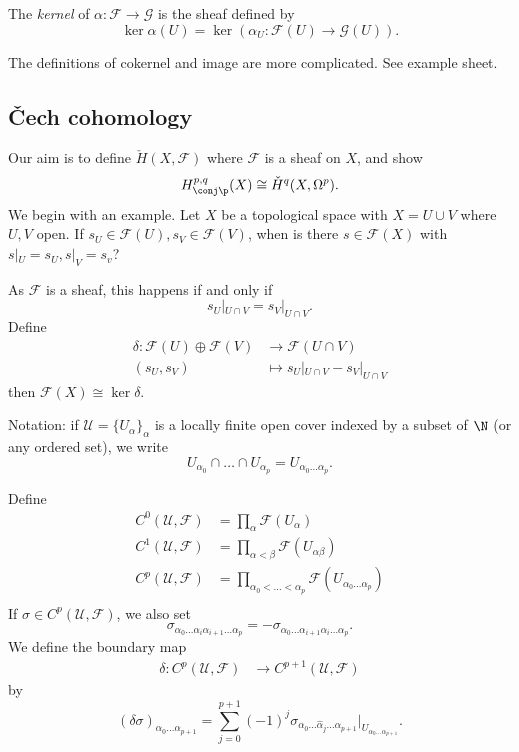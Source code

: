 \documentclass[a4paper]{article}
\begin{document}
\begin{definition}
  The \emph{kernel} of \(\alpha: \mathcal F \to \mathcal G\) is the sheaf defined by
  \[
    \ker \alpha(U) = \ker (\alpha_U: \mathcal F(U) \to \mathcal G(U)).
  \]
\end{definition}

The definitions of cokernel and image are more complicated. See example sheet.

\subsection{Čech cohomology}

Our aim is to define \(\check H(X, \mathcal F)\) where \(\mathcal F\) is a sheaf on \(X\), and show
\[
  H_{\conj \p}^{p, q}(X) \cong \check H^q(X, \Omega^p).
\]
We begin with an example. Let \(X\) be a topological space with \(X = U \cup V\) where \(U, V\) open. If \(s_U \in \mathcal F(U), s_V \in \mathcal F(V)\), when is there \(s \in \mathcal F(X)\) with \(s|_U = s_U, s|_V = s_v\)?

As \(\mathcal F\) is a sheaf, this happens if and only if
\[
  s_U|_{U \cap V} = s_V|_{U \cap V}.
\]
Define
\begin{align*}
  \delta: \mathcal F(U) \oplus \mathcal F(V) &\to \mathcal F(U \cap V) \\
  (s_U, s_V) &\mapsto s_U|_{U \cap V} - s_V|_{U \cap V}
\end{align*}
then \(\mathcal F(X) \cong \ker \delta\).

\begin{notation}
  Notation: if \(\mathcal U = \{U_\alpha\}_\alpha\) is a locally finite open cover indexed by a subset of \(\N\) (or any ordered set), we write
  \[
    U_{\alpha_0} \cap \dots \cap U_{\alpha_p} = U_{\alpha_0 \dots \alpha_p}.
  \]
\end{notation}

Define
\begin{align*}
  C^0(\mathcal U, \mathcal F) &= \prod_\alpha \mathcal F(U_\alpha) \\
  C^1(\mathcal U, \mathcal F) &= \prod_{\alpha < \beta} \mathcal F(U_{\alpha\beta}) \\
  C^p(\mathcal U, \mathcal F) &= \prod_{\alpha_0 < \dots < \alpha_p} \mathcal F(U_{\alpha_0 \dots \alpha_p}) \\
\end{align*}
If \(\sigma \in C^p(\mathcal U, \mathcal F)\), we also set
\[
  \sigma_{\alpha_0 \dots \alpha_i \alpha_{i + 1} \dots \alpha_p} = - \sigma_{\alpha_0 \dots \alpha_{i + 1} \alpha_i \dots \alpha_p}.
\]
We define the boundary map
\begin{align*}
  \delta: C^p(\mathcal U, \mathcal F) &\to C^{p + 1}(\mathcal U, \mathcal F)
\end{align*}
by
\[
  (\delta\sigma)_{\alpha_0 \dots \alpha_{p + 1}} = \sum_{j = 0}^{p + 1} (-1)^j \sigma_{\alpha_0 \dots \hat \alpha_j \dots \alpha_{p + 1}} |_{U_{\alpha_0 \dots \alpha_{p + 1}}}.
\]
\end{document}
